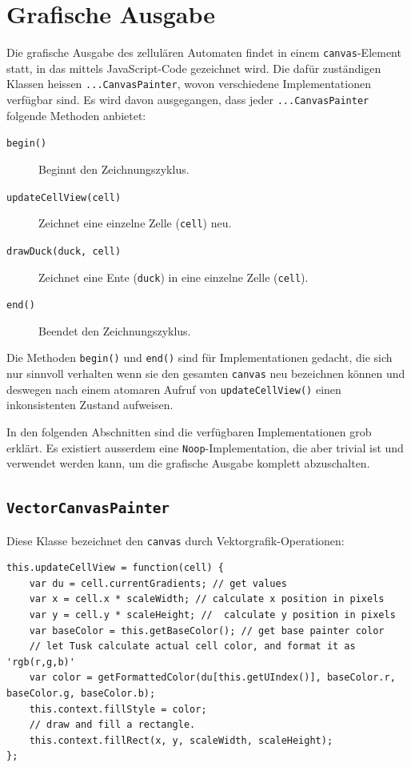 \documentclass[11pt]{article} %
\theoremstyle{definition}
\begin{document}
\section{Grafische Ausgabe}

Die grafische Ausgabe des zellulären Automaten findet in einem {\tt canvas}-Element statt, in das mittels JavaScript-Code gezeichnet wird. Die dafür zuständigen Klassen heissen {\tt ...CanvasPainter}, wovon verschiedene Implementationen verfügbar sind. Es wird davon ausgegangen, dass jeder {\tt ...CanvasPainter} folgende Methoden anbietet:

\begin{description}
\item[\tt begin()] Beginnt den Zeichnungszyklus.
\item[\tt updateCellView(cell)] Zeichnet eine einzelne Zelle ({\tt cell}) neu.
\item[\tt drawDuck(duck, cell)] Zeichnet eine Ente ({\tt duck}) in eine einzelne Zelle ({\tt cell}).
\item[\tt end()] Beendet den Zeichnungszyklus.
\end{description}

Die Methoden {\tt begin()} und {\tt end()} sind für Implementationen gedacht, die sich nur sinnvoll verhalten wenn sie den gesamten {\tt canvas} neu bezeichnen können und deswegen nach einem atomaren Aufruf von {\tt updateCellView()} einen inkonsistenten Zustand aufweisen.

In den folgenden Abschnitten sind die verfügbaren Implementationen grob erklärt. Es existiert ausserdem eine {\tt Noop}-Implementation, die aber trivial ist und verwendet werden kann, um die grafische Ausgabe komplett abzuschalten.

\subsection{{\tt VectorCanvasPainter}}

Diese Klasse bezeichnet den {\tt canvas} durch Vektorgrafik-Operationen:

\begin{lstlisting}
this.updateCellView = function(cell) {
	var du = cell.currentGradients; // get values
	var x = cell.x * scaleWidth; // calculate x position in pixels
	var y = cell.y * scaleHeight; //  calculate y position in pixels
	var baseColor = this.getBaseColor(); // get base painter color
	// let Tusk calculate actual cell color, and format it as 'rgb(r,g,b)'
	var color = getFormattedColor(du[this.getUIndex()], baseColor.r, baseColor.g, baseColor.b);
	this.context.fillStyle = color;
	// draw and fill a rectangle.
	this.context.fillRect(x, y, scaleWidth, scaleHeight);
};
\end{lstlisting}
\end{document}
